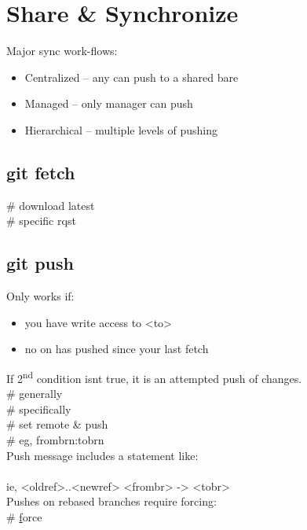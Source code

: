 \section{Share \& Synchronize}
Major sync work-flows:
\begin{itemize}
    \item Centralized -- any can push to a shared bare
    \item Managed -- only manager can push
    \item Hierarchical -- multiple levels of pushing
\end{itemize}


\subsection*{git fetch}
 \# download latest \\
 \# specific rqst \\


\subsection*{git push}
Only works if: \begin{itemize}[partopsep=0pt,topsep=0pt,parsep=0pt]
    \item you have write access to <to>
    \item no on has pushed since your last fetch
\end{itemize}
If 2\textsuperscript{nd} condition isn\textquotesingle t true, it is an attempted push of  changes.\\
 \# generally \\
 \# specifically \\
 \# set remote \& push\\
 \# eg, frombrn:tobrn \\
Push message includes a statement like:\\
\\
ie, <oldref>..<newref> <frombr> -> <tobr>\\
Pushes on rebased branches require forcing:\\
 \# \underline{f}orce


